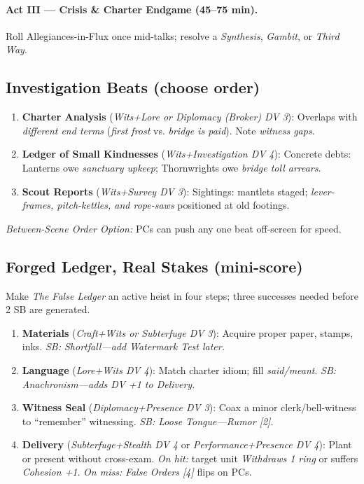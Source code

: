 \documentclass[11pt]{article}
\begin{document}
\paragraph{Act III --- Crisis \& Charter Endgame (45--75 min).} Roll Allegiances-in-Flux once mid-talks; resolve a \emph{Synthesis}, \emph{Gambit}, or \emph{Third Way}.

\subsection*{Investigation Beats (choose order)}
\begin{enumerate}[leftmargin=*]
  \item \textbf{Charter Analysis} (\emph{Wits+Lore or Diplomacy (Broker) DV 3}): Overlaps with \emph{different end terms} (\emph{first frost} vs. \emph{bridge is paid}). Note \emph{witness gaps}.
  \item \textbf{Ledger of Small Kindnesses} (\emph{Wits+Investigation DV 4}): Concrete debts: Lanterns owe \emph{sanctuary upkeep}; Thornwrights owe \emph{bridge toll arrears}.
  \item \textbf{Scout Reports} (\emph{Wits+Survey DV 3}): Sightings: mantlets staged; \emph{lever-frames, pitch-kettles, and rope-saws} positioned at old footings.
\end{enumerate}
\textit{Between-Scene Order Option:} PCs can push any one beat off-screen for speed.

\subsection*{Forged Ledger, Real Stakes (mini-score)}
Make \emph{The False Ledger} an active heist in four steps; three successes needed before 2 SB are generated.
\begin{enumerate}[leftmargin=*]
  \item \textbf{Materials} (\emph{Craft+Wits or Subterfuge DV 3}): Acquire proper paper, stamps, inks. \emph{SB: Shortfall---add Watermark Test later.}
  \item \textbf{Language} (\emph{Lore+Wits DV 4}): Match charter idiom; fill \emph{said/meant}. \emph{SB: Anachronism---adds DV +1 to Delivery.}
  \item \textbf{Witness Seal} (\emph{Diplomacy+Presence DV 3}): Coax a minor clerk/bell-witness to ``remember'' witnessing. \emph{SB: Loose Tongue---\emph{Rumor [2]}}.
  \item \textbf{Delivery} (\emph{Subterfuge+Stealth DV 4} or \emph{Performance+Presence DV 4}): Plant or present without cross-exam. \emph{On hit:} target unit \emph{Withdraws 1 ring} or suffers \emph{Cohesion +1}. \emph{On miss:} \emph{False Orders [4]} flips on PCs.
\end{enumerate}
\end{document}
